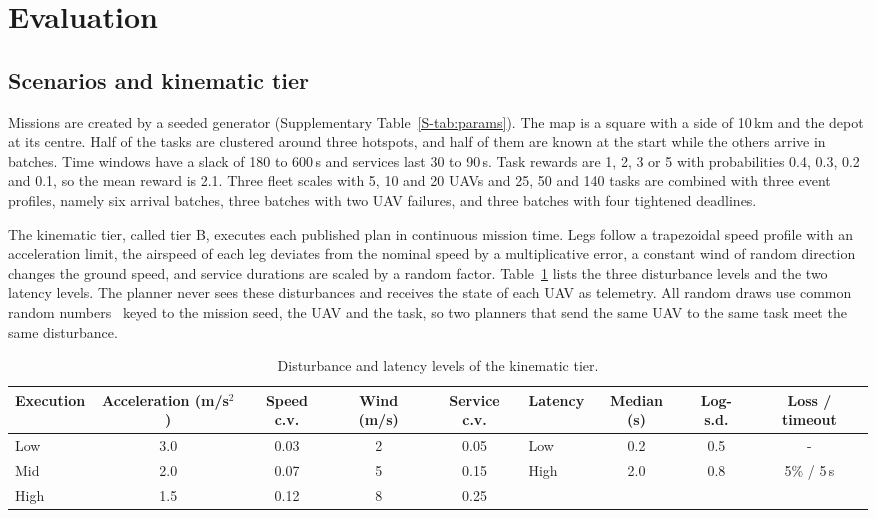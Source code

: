 \documentclass[a4paper,fleqn]{cas-dc}
\begin{document}
\section{Evaluation}\label{sec:setup}
\subsection{Scenarios and kinematic tier}
Missions are created by a seeded generator (Supplementary Table~\ref{S-tab:params}). The map is a square with a side
of 10\,km and the depot at its centre. Half of the tasks are clustered around three hotspots, and half of them are
known at the start while the others arrive in batches. Time windows have a slack of 180 to 600\,s and services last 30
to 90\,s. Task rewards are 1, 2, 3 or 5 with probabilities 0.4, 0.3, 0.2 and 0.1, so the mean reward is 2.1. Three
fleet scales with 5, 10 and 20 UAVs and 25, 50 and 140 tasks are combined with three event profiles, namely six arrival
batches, three batches with two UAV failures, and three batches with four tightened deadlines.

The kinematic tier, called tier B, executes each published plan in continuous mission time. Legs follow a trapezoidal
speed profile with an acceleration limit, the airspeed of each leg deviates from the nominal speed by a multiplicative
error, a constant wind of random direction changes the ground speed, and service durations are scaled by a random
factor. Table~\ref{tab:levels} lists the three disturbance levels and the two latency levels. The planner never sees
these disturbances and receives the state of each UAV as telemetry. All random draws use common random
numbers~\cite{law2015simulation} keyed to the mission seed, the UAV and the task, so two planners that send the same
UAV to the same task meet the same disturbance.

\begin{table}[t]
\caption{Disturbance and latency levels of the kinematic tier.}\label{tab:levels}
\centering\small
\setlength{\tabcolsep}{4pt}
\begin{tabular}{lcccc@{\quad}lccc}
\toprule
Execution & Acceleration (m/s$^2$) & Speed c.v. & Wind (m/s) & Service c.v. & Latency & Median (s) & Log-s.d. & Loss / timeout \\
\midrule
Low & 3.0 & 0.03 & 2 & 0.05 & Low & 0.2 & 0.5 & - \\
Mid & 2.0 & 0.07 & 5 & 0.15 & High & 2.0 & 0.8 & 5\% / 5\,s \\
High & 1.5 & 0.12 & 8 & 0.25 & & & & \\
\bottomrule
\end{tabular}
\end{table}
\end{document}

